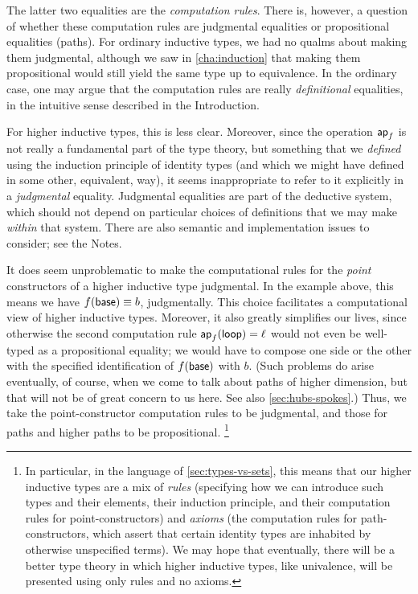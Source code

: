 %
%
The latter two equalities are the \emph{computation rules}.
There is, however, a question of whether these computation rules are judgmental equalities or propositional equalities (paths).
For ordinary inductive types, we had no qualms about making them judgmental, although we saw in \autoref{cha:induction} that making them propositional would still yield the same type up to equivalence.
In the ordinary case, one may argue that the computation rules are really \emph{definitional} equalities, in the intuitive sense described in the Introduction.

%
For higher inductive types, this is less clear. %
Moreover, since the operation $\mathsf{ap}_{f}$ is not really a fundamental part of the type theory, but something that we \emph{defined} using the induction principle of identity types (and which we might have defined in some other, equivalent, way), it seems inappropriate to refer to it explicitly in a \emph{judgmental} equality.
Judgmental equalities are part of the deductive system, which should not depend on particular choices of definitions that we may make \emph{within} that system.
There are also semantic and implementation issues to consider; see the Notes.

It does seem unproblematic to make the computational rules for the \emph{point} constructors of a higher inductive type judgmental.
In the example above, this means we have $f(\mathsf{base})\equiv b$, judgmentally.
This choice facilitates a computational view of higher inductive types.
Moreover, it also greatly simplifies our lives, since otherwise the second computation rule $\mathsf{ap}_{f} (\mathsf{loop}) = \ell$ would not even be well-typed as a propositional equality; we would have to compose one side or the other with the specified identification of $f(\mathsf{base})$ with $b$.
(Such problems do arise eventually, of course, when we come to talk about paths of higher dimension, but that will not be of great concern to us here.
See also \autoref{sec:hubs-spokes}.)
Thus, we take the point-constructor computation rules to be judgmental, and those for paths and higher paths to be propositional.%
\footnote{In particular, in the language of \autoref{sec:types-vs-sets}, this means that our higher inductive types are a mix of \emph{rules} (specifying how we can introduce such types and their elements, their induction principle, and their computation rules for point-constructors) and \emph{axioms} (the computation rules for path-constructors, which assert that certain identity types are inhabited by otherwise unspecified terms).
We may hope that eventually, there will be a better type theory in which higher inductive types, like univalence, will be presented using only rules and no axioms.%
%
%
}

